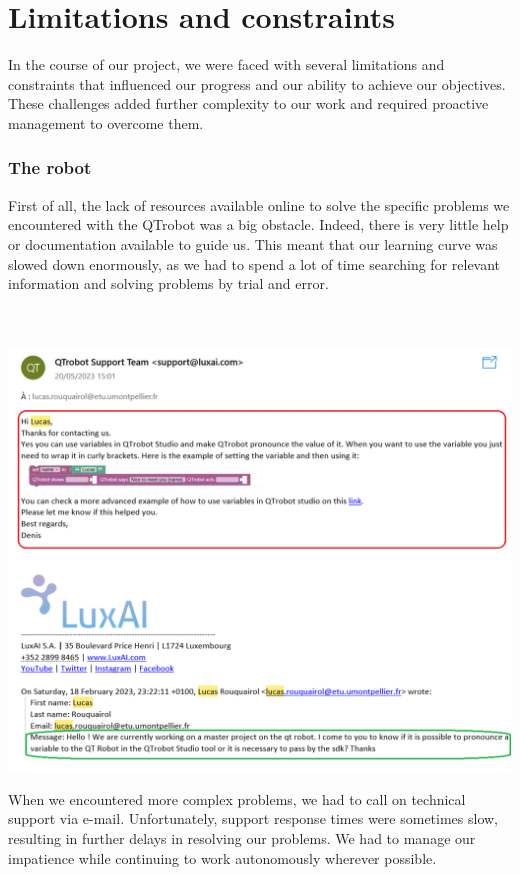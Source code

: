 \chapter{Limitations and constraints}
In the course of our project, we were faced with several limitations and constraints that influenced our progress and our ability to achieve our objectives. These challenges added further complexity to our work and required proactive management to overcome them.\\

\subsection{The robot}
First of all, the lack of resources available online to solve the specific problems we encountered with the QTrobot was a big obstacle. Indeed, there is very little help or documentation available to guide us. This meant that our learning curve was slowed down enormously, as we had to spend a lot of time searching for relevant information and solving problems by trial and error.\\
\\
\\
\begin{minipage}{.65\textwidth}%
\includegraphics[width=\textwidth]{Figures/qtsupportemail.png}
\end{minipage}%
\hfill
\begin{minipage}{.33\textwidth}%
When we encountered more complex problems, we had to call on technical support via e-mail. Unfortunately, support response times were sometimes slow, resulting in further delays in resolving our problems. We had to manage our impatience while continuing to work autonomously wherever possible.\\
\end{minipage}%
